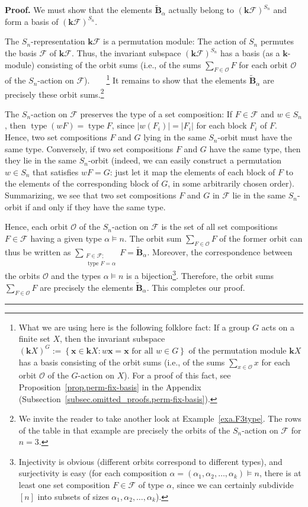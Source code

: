 \documentclass[12pt]{article}
\theoremstyle{definition}%
\theoremstyle{definition}%
\theoremstyle{remark}%
\newcommand{\tup}[1]{\left( #1 \right)}
\newcommand{\interval}[1]{\left[ #1 \right]} %
\newcommand{\set}[1]{\left\{ #1 \right\}}
\newcommand{\card}[1]{\left| #1 \right|} %
\newcommand{\kk}{\mathbf{k}}
\newcommand{\kf}{\kk\mathcal{F}}
\newcommand{\kfsn}{\left(\kf\right)^{S_n}}
\newcommand{\BBta}{\widetilde{\mathbf{B}}_{\alpha}}
\newcommand{\CF}{\mathcal{F}}
\newcommand{\xx}{\mathbf{x}}
\newcommand{\type}{\operatorname{type}}
\newenvironment{proof}[1][Proof]{\noindent\textbf{#1.} }{\ \rule{0.5em}{0.5em}}
\begin{document}
\begin{proof}
    We must show that the elements $\BBta$ actually belong to $\kfsn$ and form a basis of $\kfsn$.
    
    The $S_n$-representation $\kf$ is a permutation module: The action of $S_n$ permutes the basis $\CF$ of $\kf$.
	Thus, the invariant subspace $\kfsn$ has a basis (as a $\kk$-module) consisting of the orbit sums (i.e., of the sums $\sum_{F \in \mathcal{O}} F$ for each orbit $\mathcal{O}$ of the $S_n$-action on $\CF$).\ \ \ \ \footnote{What we are using here is the following folklore fact: If a group $G$ acts on a finite set $X$, then the invariant subspace $\tup{\kk X}^G := \set{\xx \in \kk X : w\xx = \xx \text{ for all } w \in G}$ of the permutation module $\kk X$ has a basis consisting of the orbit sums (i.e., of the sums $\sum_{x \in \mathcal{O}} x$ for each orbit $\mathcal{O}$ of the $G$-action on $X$).
	For a proof of this fact, see Proposition~\ref{prop.perm-fix-basis} in the Appendix (Subsection~\ref{subsec.omitted_proofs.perm-fix-basis}).}
    It remains to show that the elements $\BBta$ are precisely these orbit sums.\footnote{We invite the reader to take another look at Example~\ref{exa.F3type}. The rows of the table in that example are precisely the orbits of the $S_n$-action on $\CF$ for $n = 3$.}
    
    The $S_n$-action on $\CF$ preserves the type of a set composition: If $F \in \CF$ and $w \in S_n$, then $\type\tup{wF} = \type{F}$, since $\card{w\tup{F_i}} = \card{F_i}$ for each block $F_i$ of $F$.
    Hence, two set compositions $F$ and $G$ lying in the same $S_n$-orbit must have the same type.
    Conversely, if two set compositions $F$ and $G$ have the same type, then they lie in the same $S_n$-orbit (indeed, we can easily construct a permutation $w \in S_n$ that satisfies $wF = G$: just let it map the elements of each block of $F$ to the elements of the corresponding block of $G$, in some arbitrarily chosen order).
	Summarizing, we see that two set compositions $F$ and $G$ in $\CF$ lie in the same $S_n$-orbit if and only if they have the same type.

    Hence, each orbit $\mathcal{O}$ of the $S_n$-action on $\CF$ is the set of all set compositions $F \in \CF$ having a given type $\alpha \models n$.
	The orbit sum $\sum_{F \in \mathcal{O}} F$ of the former orbit can thus be written as $\sum_{\substack{F \in \CF; \\ \type F = \alpha}} F = \BBta$.
	Moreover, the correspondence between the orbits $\mathcal{O}$ and the types $\alpha \models n$ is a bijection\footnote{Injectivity is obvious (different orbits correspond to different types), and surjectivity is easy (for each composition $\alpha = \tup{\alpha_1, \alpha_2, \ldots, \alpha_k} \models n$, there is at least one set composition $F \in \CF$ of type $\alpha$, since we can certainly subdivide $\interval{n}$ into subsets of sizes $\alpha_1, \alpha_2, \ldots, \alpha_k$).}.
    Therefore, the orbit sums $\sum_{F \in \mathcal{O}} F$ are precisely %
	the elements $\BBta$. This completes our proof.
\end{proof}
\end{document}
